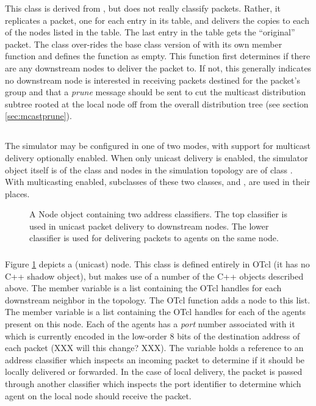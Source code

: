 This class is derived from , but does not really
classify packets.
Rather, it replicates a packet, one for each entry in its
table, and delivers the copies to each of the nodes listed
in the table.
The last entry in the table gets the ``original'' packet.
The class over-rides the base class version of  with its
own member function and defines the  function as empty.
This function first determines if there are any downstream nodes to deliver
the packet to.
If not, this generally indicates no downstream node
is interested in receiving packets destined for the packet's group and that
a {\em prune} message should be sent to cut the multicast distribution
subtree rooted at the local node off from the overall distribution tree
(see section \ref{sec:mcastprune}).


\subsection{}

The simulator may be configured in one of two modes, with support
for multicast delivery optionally enabled.
When only unicast delivery is enabled, the simulator object
itself is of the class  and nodes in the simulation
topology are of class .
With multicasting enabled, subclasses of these two classes,
 and , are used in their places.

\begin{figure}[h]
\centerline{}
\caption{\label{pic:node}A Node object containing
two address classifiers.
The top classifier is used in unicast packet delivery to downstream
nodes.
The lower classifier is used for delivering packets to agents
on the same node.}
\end{figure}

\subsubsection{}

Figure \ref{pic:node} depicts a (unicast) node.
This class is defined entirely in OTcl (it has no C++ shadow object),
but makes use of a number of the C++ objects described above.
The  member variable is a list containing the
OTcl handles for each downstream neighbor in the topology.
The OTcl function  adds a node to this list.
The  member variable is a list containing the
OTcl handles for each of the agents present on this node.
Each of the agents has a {\em port} number associated with it
which is currently encoded in the low-order 8 bits of the destination
address of each packet (XXX will this change? XXX).
The  variable holds a reference to an address
classifier which inspects an incoming packet to determine
if it should be locally delivered or forwarded.
In the case of local delivery, the packet is passed through another
classifier which inspects the port identifier to determine which
agent on the local node should receive the packet.

